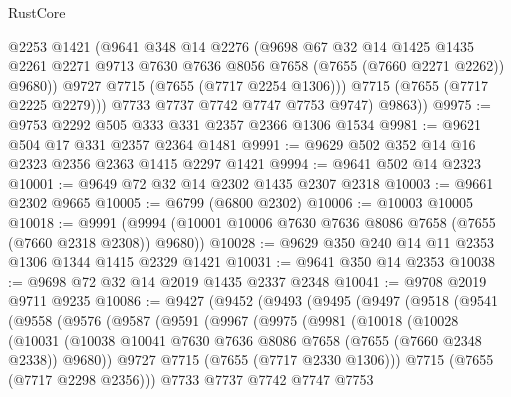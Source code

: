 \begin{lexlean}{RustCore}
\begin{coremodule}
              @2253
              @1421
              (@9641
                @348
                @14
                @2276
                (@9698
                  @67
                  @32
                  @14
                  @1425
                  @1435
                  @2261
                  @2271
                  @9713
                  @7630
                  @7636
                  @8056
                  @7658
                  (@7655 (@7660 @2271 @2262))
                  @9680))
              @9727
              @7715
              (@7655 (@7717 @2254 @1306)))
            @7715
            (@7655 (@7717 @2225 @2279)))
          @7733
          @7737
          @7742
          @7747
          @7753
          @9747)
        @9863))
@9975 := @9753 @2292 @505 @333 @331 @2357 @2366 @1306 @1534
@9981 := @9621 @504 @17 @331 @2357 @2364 @1481
@9991 := @9629 @502 @352 @14 @16 @2323 @2356 @2363 @1415 @2297 @1421
@9994 := @9641 @502 @14 @2323
@10001 := @9649 @72 @32 @14 @2302 @1435 @2307 @2318
@10003 := @9661 @2302 @9665
@10005 := @6799 (@6800 @2302)
@10006 := @10003 @10005
@10018 := @9991 (@9994 (@10001 @10006 @7630 @7636 @8086 @7658 (@7655 (@7660 @2318 @2308)) @9680))
@10028 := @9629 @350 @240 @14 @11 @2353 @1306 @1344 @1415 @2329 @1421
@10031 := @9641 @350 @14 @2353
@10038 := @9698 @72 @32 @14 @2019 @1435 @2337 @2348
@10041 := @9708 @2019 @9711 @9235
@10086 := @9427
    (@9452
      (@9493
        (@9495
          (@9497
            (@9518
              (@9541
                (@9558
                  (@9576
                    (@9587
                      (@9591
                        (@9967
                          (@9975
                            (@9981
                              (@10018
                                (@10028
                                  (@10031
                                    (@10038
                                      @10041
                                      @7630
                                      @7636
                                      @8086
                                      @7658
                                      (@7655 (@7660 @2348 @2338))
                                      @9680))
                                  @9727
                                  @7715
                                  (@7655 (@7717 @2330 @1306)))
                                @7715
                                (@7655 (@7717 @2298 @2356)))
                              @7733
                              @7737
                              @7742
                              @7747
                              @7753

\end{coremodule}
\end{lexlean}
